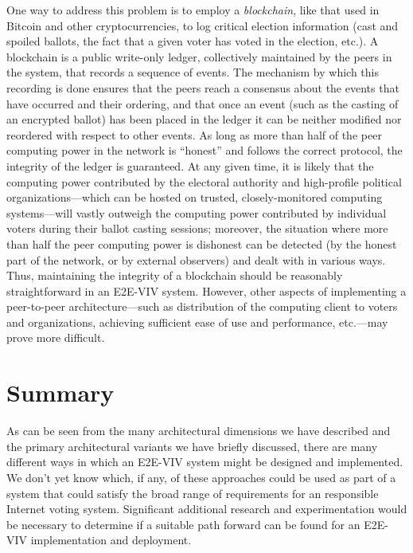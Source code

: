 One way to address this problem is to employ a \emph{blockchain}, like
that used in Bitcoin and other cryptocurrencies, to log critical
election information (cast and spoiled ballots, the fact that a given
voter has voted in the election, etc.). A blockchain is a public
write-only ledger, collectively maintained by the peers in the system,
that records a sequence of events. The mechanism by which this
recording is done ensures that the peers reach a consensus about the
events that have occurred and their ordering, and that once an event
(such as the casting of an encrypted ballot) has been placed in the
ledger it can be neither modified nor reordered with respect to other
events. As long as more than half of the peer computing power in the
network is ``honest'' and follows the correct protocol, the integrity
of the ledger is guaranteed. At any given time, it is likely that the
computing power contributed by the electoral authority and
high-profile political organizations---which can be hosted on trusted,
closely-monitored computing systems---will vastly outweigh the
computing power contributed by individual voters during their ballot
casting sessions; moreover, the situation where more than half the
peer computing power is dishonest can be detected (by the honest part
of the network, or by external observers) and dealt with in various
ways. Thus, maintaining the integrity of a blockchain should be
reasonably straightforward in an E2E-VIV system. However, other aspects
of implementing a peer-to-peer architecture---such as distribution of
the computing client to voters and organizations, achieving sufficient
ease of use and performance, etc.---may prove more difficult.

\section{Summary}

As can be seen from the many architectural dimensions we have
described and the primary architectural variants we have briefly
discussed, there are many different ways in which an E2E-VIV system
might be designed and implemented.  We don't yet know which, if any,
of these approaches could be used as part of a system that could
satisfy the broad range of requirements for an responsible Internet
voting system.  Significant additional research and experimentation
would be necessary to determine if a suitable path forward can be
found for an E2E-VIV implementation and deployment.


